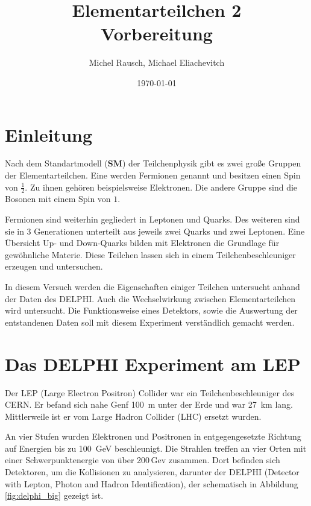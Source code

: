 \documentclass[a4paper,ngerman]{scrartcl}
\title{Elementarteilchen 2\\Vorbereitung}
\date{\today}
\author{Michel Rausch, Michael Eliachevitch}
\begin{document}
\maketitle
\tableofcontents
\newpage

\section{Einleitung}

Nach dem Standartmodell (\textbf{SM}) der Teilchenphysik gibt es zwei große Gruppen der Elementarteilchen.
Eine werden Fermionen genannt und besitzen einen Spin von $\frac{1}{2}$. 
Zu ihnen gehören beispielsweise Elektronen.
Die andere Gruppe sind die Bosonen mit einem Spin von $1$.

Fermionen sind weiterhin gegliedert in Leptonen und Quarks.
Des weiteren sind sie in 3 Generationen unterteilt aus jeweils zwei Quarks und zwei Leptonen. 
Eine Übersicht 
Up- und Down-Quarks bilden mit Elektronen die Grundlage für gewöhnliche Materie.
Diese Teilchen lassen sich in einem Teilchenbeschleuniger erzeugen und untersuchen.

In diesem Versuch werden die Eigenschaften einiger Teilchen untersucht anhand der Daten des DELPHI. 
Auch die Wechselwirkung zwischen Elementarteilchen wird untersucht.
Die Funktionsweise eines Detektors, sowie die Auswertung der entstandenen Daten soll mit diesem Experiment verständlich gemacht werden.



\section{Das DELPHI Experiment am LEP}
\label{sec:delphi}

Der LEP (Large Electron Positron) Collider war ein Teilchenbeschleuniger des CERN.
Er befand sich nahe Genf \SI{100}{\metre} unter der Erde und war \SI{27}{\kilo \metre} lang. 
Mittlerweile ist er vom Large Hadron Collider (LHC) ersetzt wurden.

An vier Stufen wurden Elektronen und Positronen in entgegengesetzte Richtung auf Energien bis zu \SI{100}{GeV} beschleunigt.
Die Strahlen treffen an vier Orten mit einer Schwerpunktenergie von über 200\,Gev zusammen.
Dort befinden sich Detektoren, um die Kollisionen zu analysieren, darunter der DELPHI (Detector with Lepton, Photon and Hadron Identification), der schematisch in Abbildung \ref{fig:delphi_big} gezeigt ist.
\end{document}
